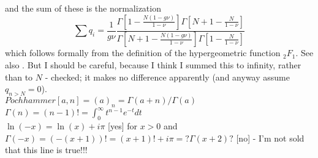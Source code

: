 and the sum of these is the normalization
\begin{equation*}
\sum q_i = \frac{1}{g\nu} \frac{\Gamma[1-\frac{N(1-g\nu)}{1-\nu}]\Gamma[N+1-\frac{N}{1-\nu}]}{\Gamma[N+1-\frac{N(1-g\nu)}{1-\nu}]\Gamma[1-\frac{N}{1-\nu}]}
\end{equation*}
which follows formally from the definition of the hypergeometric function $_2F_1$. 
See also \cite{McKane2004b}. 
\iffalse%
But I should be careful, because I think I summed this to infinity, rather than to $N$ - checked; it makes no difference apparently (and anyway assume $q_{n>N}=0$). \\
$Pochhammer[a,n] = (a)_n = \Gamma(a+n)/\Gamma(a)$ \\
$\Gamma(n) = (n-1)! = \int_0^\infty t^{n-1}e^{-t}dt$ \\
$\ln(-x)=\ln(x)+i\pi$ [yes] for $x>0$ and $\Gamma(-x)=(-(x+1))!=(x+1)!+i\pi=?\Gamma(x+2)?$ [no] - I'm not sold that this line is true!!! \\
